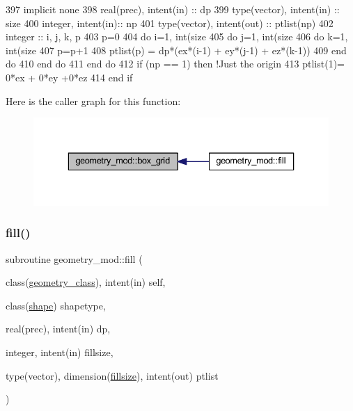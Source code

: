 \begin{DoxyCode}
397     \textcolor{keywordtype}{implicit none}
398     \textcolor{keywordtype}{real(prec)}, \textcolor{keywordtype}{intent(in)} :: dp
399     \textcolor{keywordtype}{type}(vector), \textcolor{keywordtype}{intent(in)} :: size
400     \textcolor{keywordtype}{integer}, \textcolor{keywordtype}{intent(in)}::  np
401     \textcolor{keywordtype}{type}(vector), \textcolor{keywordtype}{intent(out)} :: ptlist(np)
402     \textcolor{keywordtype}{integer} :: i, j, k, p
403     p=0
404     \textcolor{keywordflow}{do} i=1, int(size%
405         \textcolor{keywordflow}{do} j=1, int(size%
406             \textcolor{keywordflow}{do} k=1, int(size%
407                 p=p+1
408                 ptlist(p) = dp*(ex*(i-1) + ey*(j-1) + ez*(k-1))
409 \textcolor{keywordflow}{            end do}
410 \textcolor{keywordflow}{        end do}
411 \textcolor{keywordflow}{    end do}
412     \textcolor{keywordflow}{if} (np == 1) \textcolor{keywordflow}{then} \textcolor{comment}{!Just the origin}
413         ptlist(1)= 0*ex + 0*ey +0*ez
414 \textcolor{keywordflow}{    end if}
\end{DoxyCode}
Here is the caller graph for this function\+:
\nopagebreak
\begin{figure}[H]
\begin{center}
\leavevmode
\includegraphics[width=336pt]{namespacegeometry__mod_ae87e4ecff2d21a839da2b82919b5fd0b_icgraph}
\end{center}
\end{figure}
\mbox{\label{namespacegeometry__mod_a1d97564e04562532b5389bfb91aa676b}} 
\subsubsection{\texorpdfstring{fill()}{fill()}}
{\footnotesize\ttfamily subroutine geometry\+\_\+mod\+::fill (\begin{DoxyParamCaption}\item[{class(\mbox{\hyperlink{structgeometry__mod_1_1geometry__class}{geometry\+\_\+class}}), intent(in)}]{self,  }\item[{class(\mbox{\hyperlink{structgeometry__mod_1_1shape}{shape}})}]{shapetype,  }\item[{real(prec), intent(in)}]{dp,  }\item[{integer, intent(in)}]{fillsize,  }\item[{type(vector), dimension(\mbox{\hyperlink{namespacegeometry__mod_ad790edd694561b33dad20cfa3a14e8f2}{fillsize}}), intent(out)}]{ptlist }\end{DoxyParamCaption})\hspace{0.3cm}{\ttfamily [private]}}



